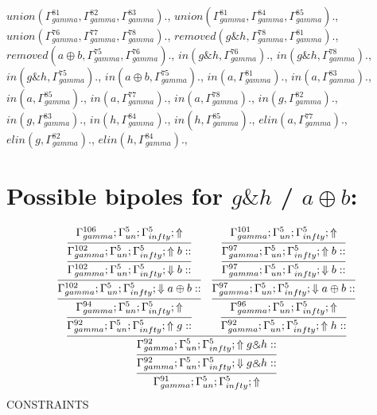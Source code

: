 \documentclass[a4paper, 11pt]{article}
\begin{document}
$union(\Gamma_{gamma}^{81}, \Gamma_{gamma}^{82}, \Gamma_{gamma}^{83}).$, $union(\Gamma_{gamma}^{81}, \Gamma_{gamma}^{84}, \Gamma_{gamma}^{85}).$, $union(\Gamma_{gamma}^{76}, \Gamma_{gamma}^{77}, \Gamma_{gamma}^{78}).$, $removed(g \binampersand h, \Gamma_{gamma}^{78}, \Gamma_{gamma}^{81}).$, $removed(a \oplus b, \Gamma_{gamma}^{75}, \Gamma_{gamma}^{76}).$, $in(g \binampersand h, \Gamma_{gamma}^{76}).$, $in(g \binampersand h, \Gamma_{gamma}^{78}).$, $in(g \binampersand h, \Gamma_{gamma}^{75}).$, $in(a \oplus b, \Gamma_{gamma}^{75}).$, $in(a, \Gamma_{gamma}^{81}).$, $in(a, \Gamma_{gamma}^{83}).$, $in(a, \Gamma_{gamma}^{85}).$, $in(a, \Gamma_{gamma}^{77}).$, $in(a, \Gamma_{gamma}^{78}).$, $in(g, \Gamma_{gamma}^{82}).$, $in(g, \Gamma_{gamma}^{83}).$, $in(h, \Gamma_{gamma}^{84}).$, $in(h, \Gamma_{gamma}^{85}).$, $elin(a, \Gamma_{gamma}^{77}).$, $elin(g, \Gamma_{gamma}^{82}).$, $elin(h, \Gamma_{gamma}^{84}).$, 
\section{Possible bipoles for $g \binampersand h$ / $a \oplus b$:} 

{\small
\[
\infer{\Gamma_{ gamma}^{91} ; \Gamma_{un}^{5} ; \Gamma_{ infty}^{5} ;  \Uparrow }
{\infer{\Gamma_{ gamma}^{92} ; \Gamma_{un}^{5} ; \Gamma_{ infty}^{5} ;  \Downarrow g \binampersand h :: }
{\infer{\Gamma_{ gamma}^{92} ; \Gamma_{un}^{5} ; \Gamma_{ infty}^{5} ;  \Uparrow g \binampersand h :: }
{\infer{\Gamma_{ gamma}^{92} ; \Gamma_{un}^{5} ; \Gamma_{ infty}^{5} ;  \Uparrow g :: }
{\infer{\Gamma_{ gamma}^{94} ; \Gamma_{un}^{5} ; \Gamma_{ infty}^{5} ;  \Uparrow }
{\infer{\Gamma_{ gamma}^{102} ; \Gamma_{un}^{5} ; \Gamma_{ infty}^{5} ;  \Downarrow a \oplus b :: }
{\infer{\Gamma_{ gamma}^{102} ; \Gamma_{un}^{5} ; \Gamma_{ infty}^{5} ;  \Downarrow b :: }
{\infer{\Gamma_{ gamma}^{102} ; \Gamma_{un}^{5} ; \Gamma_{ infty}^{5} ;  \Uparrow b :: }
{\Gamma_{ gamma}^{106} ; \Gamma_{un}^{5} ; \Gamma_{ infty}^{5} ;  \Uparrow }}}}}
&
\infer{\Gamma_{ gamma}^{92} ; \Gamma_{un}^{5} ; \Gamma_{ infty}^{5} ;  \Uparrow h :: }
{\infer{\Gamma_{ gamma}^{96} ; \Gamma_{un}^{5} ; \Gamma_{ infty}^{5} ;  \Uparrow }
{\infer{\Gamma_{ gamma}^{97} ; \Gamma_{un}^{5} ; \Gamma_{ infty}^{5} ;  \Downarrow a \oplus b :: }
{\infer{\Gamma_{ gamma}^{97} ; \Gamma_{un}^{5} ; \Gamma_{ infty}^{5} ;  \Downarrow b :: }
{\infer{\Gamma_{ gamma}^{97} ; \Gamma_{un}^{5} ; \Gamma_{ infty}^{5} ;  \Uparrow b :: }
{\Gamma_{ gamma}^{101} ; \Gamma_{un}^{5} ; \Gamma_{ infty}^{5} ;  \Uparrow }}}}}}}}
\]
}
CONSTRAINTS
\end{document}
